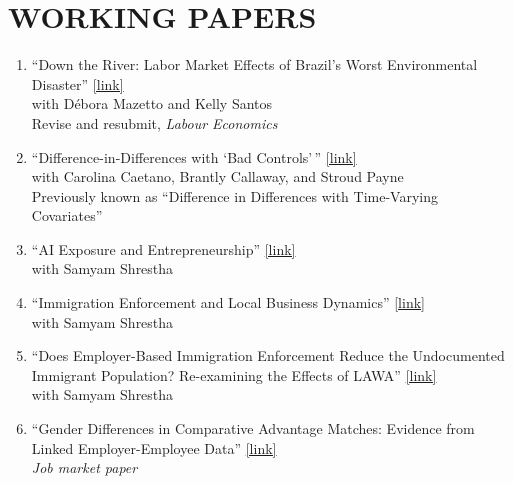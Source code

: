 \documentclass[11pt,letterpaper]{article}
\begin{document}
\section*{WORKING PAPERS}
\begin{enumerate}
    \item ``Down the River: Labor Market Effects of Brazil's Worst Environmental Disaster'' \href{https://papers.ssrn.com/sol3/papers.cfm?abstract_id=7139278}{[link]} \\
    with D\'ebora Mazetto and Kelly Santos \\
    Revise and resubmit, \textit{Labour Economics}

    \item ``Difference-in-Differences with `Bad Controls'\,'' \href{https://arxiv.org/abs/2608.03881}{[link]} \\
    with Carolina Caetano, Brantly Callaway, and Stroud Payne \\
    Previously known as ``Difference in Differences with Time-Varying Covariates''

    \item ``AI Exposure and Entrepreneurship'' \href{https://papers.ssrn.com/sol3/papers.cfm?abstract_id=7384321}{[link]} \\
    with Samyam Shrestha

    \item ``Immigration Enforcement and Local Business Dynamics'' \href{https://papers.ssrn.com/sol3/papers.cfm?abstract_id=7271958}{[link]} \\
    with Samyam Shrestha

    \item ``Does Employer-Based Immigration Enforcement Reduce the Undocumented Immigrant Population? Re-examining the Effects of LAWA'' \href{https://hsantanna.org/files/SantAnnaShrestha_LAWA.pdf}{[link]} \\
    with Samyam Shrestha

    \item ``Gender Differences in Comparative Advantage Matches: Evidence from Linked Employer-Employee Data'' \href{https://arxiv.org/abs/2411.03209}{[link]} \\
    \textit{Job market paper}
\end{enumerate}

\end{document}
